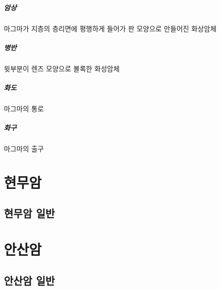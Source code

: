 \documentclass[12pt, a4paper, twoside]{book}
\begin{document}
			\paragraph{암상}
			마그마가 지층의 층리면에 평행하게 들어가 판 모양으로 만들어진 화상암체
			
			\paragraph{병반}
			윗부분이 렌즈 모양으로 볼록한 화성암체
			
			\paragraph{화도}
			마그마의 통로
			
			\paragraph{화구}
			마그마의 출구





	\clearpage
	\chapter{현무암}
	\minitoc				%

	\clearpage
	\section{현무암 일반}


	\clearpage
	\chapter{안산암}
	\minitoc				%

	\clearpage
	\section{안산암 일반}
\end{document}
